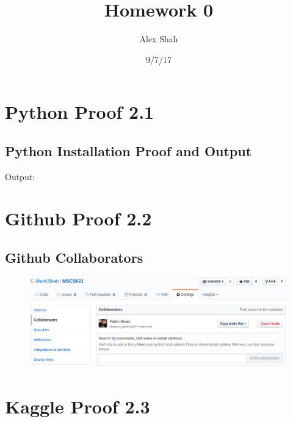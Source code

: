 \documentclass[a4paper]{article}
\title{Homework 0}
\author{Alex Shah}
\date{9/7/17}
\begin{document}
\lstset{language=Python}

\maketitle

\section{Python Proof 2.1}
\subsection{Python Installation Proof and Output}

Output:


\clearpage

\section{Github Proof 2.2}
\subsection{Github Collaborators}
\begin{figure}[H]
  \includegraphics[width=\textwidth]{2-2-gitProof.png}  
\end{figure}

\clearpage

\section{Kaggle Proof 2.3}
\end{document}
